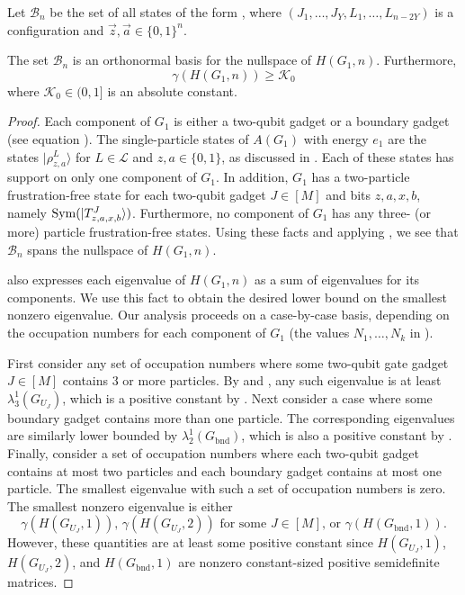 \documentclass[../thesis-main/thesis-main]{subfiles}
\begin{document}
\begin{definition}
Let $\mathcal{B}_{n}$ be the set of all states of the form , where $(J_{1},\ldots,J_{Y},L_{1},\ldots,L_{n-2Y})$ is a configuration and $\vec{z},\vec{a}\in\{0,1\}^{n}$.
\end{definition}

\begin{lemma}
\label{lem:gs_g_alpha}The set $\mathcal{B}_{n}$ is an orthonormal
basis for the nullspace of $H(G_{1},n)$. Furthermore,
\begin{equation}
  \gamma(H(G_{1},n)) \geq \mathcal{K}_0
\label{eq:first_lowerbnd}
\end{equation}
where $\mathcal{K}_0\in (0,1]$ is an absolute constant.
\end{lemma}

\begin{proof}
Each component of $G_{1}$ is either a two-qubit gadget or a boundary gadget (see equation ). The single-particle states of $A(G_{1})$ with energy $e_{1}$ are the states $|\rho_{z,a}^{L}\rangle$ for $L\in\mathcal{L}$ and $z,a\in\{0,1\}$, as discussed in . Each of these states has support on only one component of $G_{1}$. In addition, $G_{1}$ has a two-particle frustration-free state for each two-qubit gadget $J\in[M]$ and bits $z,a,x,b$, namely $\operatorname{Sym}(|T_{z,a,x,b}^{J}\rangle)$. Furthermore, no component of $G_{1}$ has any three- (or more) particle frustration-free states. Using these facts and applying , we see that $\mathcal{B}_{n}$ spans the nullspace of $H(G_{1},n)$.

 also expresses each eigenvalue of $H(G_{1},n)$ as a sum of eigenvalues for its components. We use this fact to obtain the desired lower bound on the smallest nonzero eigenvalue. Our analysis proceeds on a case-by-case basis, depending on the occupation numbers for each component of $G_{1}$ (the values $N_{1},\ldots,N_{k}$ in ).

First consider any set of occupation numbers where some two-qubit gate gadget $J\in[M]$ contains 3 or more particles. By  and , any such eigenvalue is at least $\lambda_{3}^{1}(G_{U_J})$, which is a positive constant by . Next consider a case where some boundary gadget contains more than one particle. The corresponding eigenvalues are similarly lower bounded by $\lambda_{2}^{1}(G_{\text{bnd}})$, which is also a positive constant by . Finally, consider a set of occupation numbers where each two-qubit gadget contains at most two particles and each boundary gadget contains at most one particle. The smallest eigenvalue with such a set of occupation numbers is zero. The smallest nonzero eigenvalue is either
\begin{equation}
\gamma(H(G_{U_J},1)),\,\gamma(H(G_{U_J},2))\text{ for some $J\in[M]$, or }\gamma(H(G_{\text{bnd}},1)).
\end{equation}
However, these quantities are at least some positive constant since $H(G_{U_J},1)$, $H(G_{U_J},2)$, and $H(G_{\text{bnd}},1)$ are nonzero constant-sized positive semidefinite matrices.


\end{proof}
\end{document}
